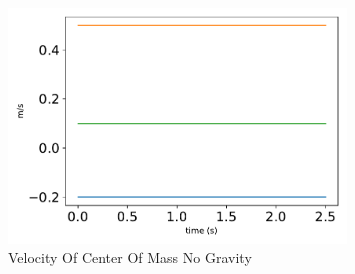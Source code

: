 \begin{figure}[htbp]\centerline{\includegraphics[width=0.8\textwidth]{AutoTeX/VelocityOfCenterOfMassNoGravity}}\caption{Velocity Of Center Of Mass No Gravity}\label{fig:VelocityOfCenterOfMassNoGravity}\end{figure}